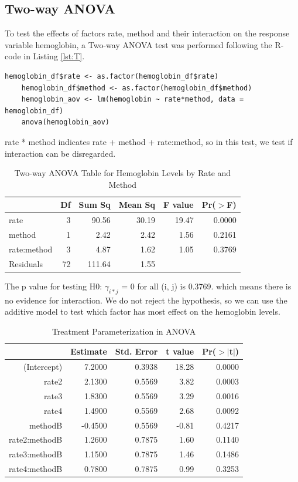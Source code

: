 \documentclass{article}
\begin{document}
\subsection{Two-way ANOVA}
To test the effects of factors rate, method and their interaction on the response variable hemoglobin, a Two-way ANOVA test was performed following the R-code in Listing \ref{lst:T}. 
\begin{lstlisting}[caption="Two-way ANOVA", label={lst:T}]
    hemoglobin_df$rate <- as.factor(hemoglobin_df$rate) 
    hemoglobin_df$method <- as.factor(hemoglobin_df$method)
    hemoglobin_aov <- lm(hemoglobin ~ rate*method, data = hemoglobin_df)
    anova(hemoglobin_aov)   
\end{lstlisting}
rate * method indicates rate + method + rate:method, so in this test, we test if interaction can be disregarded. 

\begin{table}[ht]
\centering
\caption{Two-way ANOVA Table for Hemoglobin Levels by Rate and Method} 
\label{tab:hemoglobin_anova}
\begin{tabular}{lrrrrr}
  \hline
 & Df & Sum Sq & Mean Sq & F value & Pr($>$F) \\ 
  \hline
rate & 3 & 90.56 & 30.19 & 19.47 & 0.0000 \\ 
  method & 1 & 2.42 & 2.42 & 1.56 & 0.2161 \\ 
  rate:method & 3 & 4.87 & 1.62 & 1.05 & 0.3769 \\ 
  Residuals & 72 & 111.64 & 1.55 &  &  \\ 
   \hline
\end{tabular}
\end{table}

The p value for testing H0: $\gamma_{i*j}$ = 0 for all (i, j) is 0.3769. which means there is no evidence for interaction. We do not reject the hypothesis, so we can use the additive model to test which factor has most effect on the hemoglobin levels. 

\begin{table}[ht]
\caption{Treatment Parameterization in ANOVA}
\label{tab:treatment}
\centering
\begin{tabular}{rrrrr}
  \hline
 & Estimate & Std. Error & t value & Pr($>$$|$t$|$) \\ 
  \hline
(Intercept) & 7.2000 & 0.3938 & 18.28 & 0.0000 \\ 
  rate2 & 2.1300 & 0.5569 & 3.82 & 0.0003 \\ 
  rate3 & 1.8300 & 0.5569 & 3.29 & 0.0016 \\ 
  rate4 & 1.4900 & 0.5569 & 2.68 & 0.0092 \\ 
  methodB & -0.4500 & 0.5569 & -0.81 & 0.4217 \\ 
  rate2:methodB & 1.2600 & 0.7875 & 1.60 & 0.1140 \\ 
  rate3:methodB & 1.1500 & 0.7875 & 1.46 & 0.1486 \\ 
  rate4:methodB & 0.7800 & 0.7875 & 0.99 & 0.3253 \\ 
   \hline
\end{tabular}
\end{table}
\end{document}
